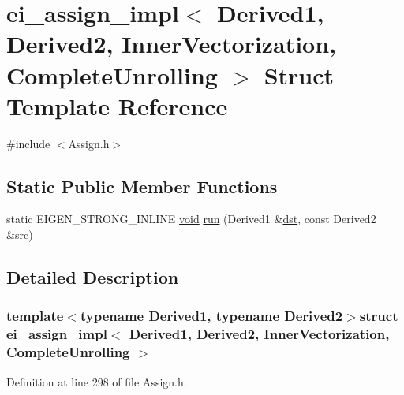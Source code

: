 \hypertarget{structei__assign__impl_3_01_derived1_00_01_derived2_00_01_inner_vectorization_00_01_complete_unrolling_01_4}{\section{ei\-\_\-assign\-\_\-impl$<$ Derived1, Derived2, Inner\-Vectorization, Complete\-Unrolling $>$ Struct Template Reference}
\label{structei__assign__impl_3_01_derived1_00_01_derived2_00_01_inner_vectorization_00_01_complete_unrolling_01_4}
}


{\ttfamily \#include $<$Assign.\-h$>$}

\subsection*{Static Public Member Functions}
\begin{DoxyCompactItemize}
\item 
static E\-I\-G\-E\-N\-\_\-\-S\-T\-R\-O\-N\-G\-\_\-\-I\-N\-L\-I\-N\-E \hyperlink{group___u_a_v_objects_plugin_ga444cf2ff3f0ecbe028adce838d373f5c}{void} \hyperlink{structei__assign__impl_3_01_derived1_00_01_derived2_00_01_inner_vectorization_00_01_complete_unrolling_01_4_ac7288dd2732072b265f0e3f884d107fd}{run} (Derived1 \&\hyperlink{glext_8h_a92034251bfd455d524a9b5610cddba00}{dst}, const Derived2 \&\hyperlink{glext_8h_a72e0fdf0f845ded60b1fada9e9195cd7}{src})
\end{DoxyCompactItemize}


\subsection{Detailed Description}
\subsubsection*{template$<$typename Derived1, typename Derived2$>$struct ei\-\_\-assign\-\_\-impl$<$ Derived1, Derived2, Inner\-Vectorization, Complete\-Unrolling $>$}



Definition at line 298 of file Assign.\-h.



